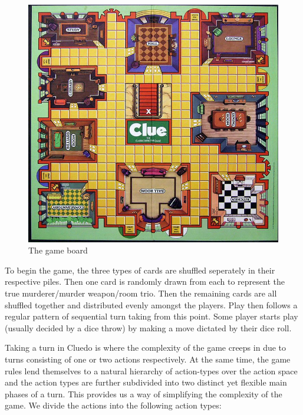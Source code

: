 \documentclass[msc, deptreport, ai, romanprepages]{infthesis}
\begin{document}
\begin{figure}[h]
\caption{The game board}
\centering
\includegraphics[scale=.825]{figures/board}
\end{figure}

To begin the game, the three types of cards are shuffled seperately in their respective piles. Then one card is randomly drawn from each to represent the true murderer/murder weapon/room trio. Then the remaining cards are all shuffled together and distributed evenly amongst the players. Play then follows a regular pattern of sequential turn taking from this point. Some player starts play (usually decided by a dice throw) by making a move dictated by their dice roll. 

Taking a turn in Cluedo is where the complexity of the game creeps in due to turns consisting of one or two actions respectively. At the same time, the game rules lend themselves to a natural hierarchy of action-types over the action space and the action types are further subdivided into two distinct yet flexible main phases of a turn. This provides us a way of simplifying the complexity of the game. We divide the actions into the following action types:
\end{document}
